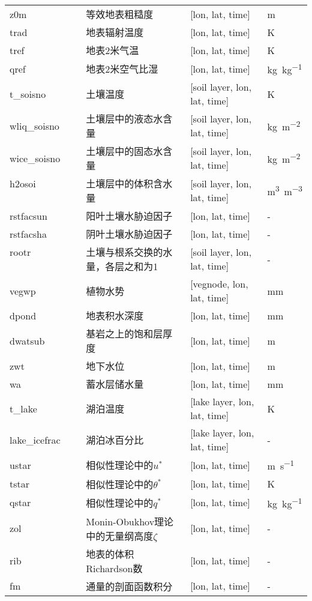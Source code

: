 \documentclass[a4paper,12pt,twoside]{article}
\begin{document}
\begin{longtable}[htbp]{lp{}p{}l}
z0m & 等效地表粗糙度 & {[}lon, lat, time{]}  & m \\
trad & 地表辐射温度 & {[}lon, lat, time{]}  & K \\
tref & 地表2米气温 & {[}lon, lat, time{]}  & K \\
qref & 地表2米空气比湿 & {[}lon, lat, time{]}  & \unit{kg.kg^{-1}} \\
t\_soisno ~ ~ ~ & 土壤温度 & {[}soil layer, lon, lat, time{]} & K \\
wliq\_soisno~ ~ & 土壤层中的液态水含量 & {[}soil layer, lon, lat, time{]} & \unit{kg.m^{-2}} \\
wice\_soisno~ ~ & 土壤层中的固态水含量& {[}soil layer, lon, lat, time{]} & \unit{kg.m^{-2}} \\
h2osoi ~ ~ ~ ~ ~ ~ ~ & 土壤层中的体积含水量 & {[}soil layer, lon, lat,
time{]}  & \unit{m^3.m^{-3}} \\
rstfacsun ~ ~ & 阳叶土壤水胁迫因子 & {[}lon, lat, time{]}  & - \\
rstfacsha ~ ~ & 阴叶土壤水胁迫因子 & {[}lon, lat, time{]}  & - \\
rootr ~ ~ ~ ~ ~ ~ ~ & 土壤与根系交换的水量，各层之和为1 & {[}soil layer, lon, lat, time{]}  & - \\
vegwp & 植物水势 & {[}vegnode, lon, lat, time{]}  & mm \\ %
dpond & 地表积水深度 & {[}lon, lat, time{]}  & mm \\
dwatsub & 基岩之上的饱和层厚度 & {[}lon, lat, time{]}  & m \\
zwt & 地下水位 & {[}lon, lat, time{]}  & m \\
wa & 蓄水层储水量 & {[}lon, lat, time{]}  & mm \\
t\_lake & 湖泊温度 & {[}lake layer, lon, lat, time{]}  & K \\
lake\_icefrac & 湖泊冰百分比 & {[}lake layer, lon, lat, time{]} & - \\
ustar~ ~ & 相似性理论中的$u^*$ & {[}lon, lat, time{]}  & \unit{m.s^{-1}} \\
tstar~ ~ & 相似性理论中的$\theta ^*$ & {[}lon, lat, time{]}  & K \\
qstar~ ~ & 相似性理论中的$q^*$ & {[}lon, lat, time{]}  & \unit{kg.kg^{-1}} \\
zol~ ~ ~ & Monin-Obukhov理论中的无量纲高度$\zeta$ & {[}lon, lat, time{]} & - \\
rib~ ~ ~ & 地表的体积Richardson数 & {[}lon, lat, time{]}  & - \\
fm ~ ~ ~ & 通量的剖面函数积分 & {[}lon, lat, time{]}  & - \\

\end{longtable}
\end{document}
